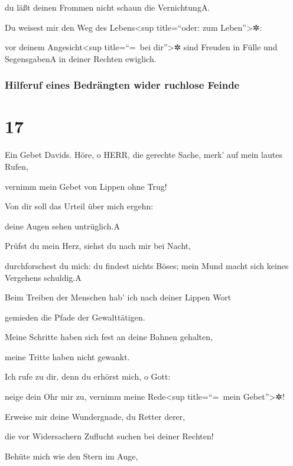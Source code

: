 du läßt deinen Frommen nicht schaun die Vernichtung{A}.

Du weisest mir den Weg des Lebens\textless sup
title=``oder: zum Leben''\textgreater✲:

vor deinem Angesicht\textless sup title=``=~bei dir''\textgreater✲ sind
Freuden in Fülle und Segensgaben{A} in deiner Rechten ewiglich.

\hypertarget{hilferuf-eines-bedruxe4ngten-wider-ruchlose-feinde}{%
\subsubsection{Hilferuf eines Bedrängten wider ruchlose
Feinde}\label{hilferuf-eines-bedruxe4ngten-wider-ruchlose-feinde}}

\hypertarget{section-16}{%
\section{17}\label{section-16}}

Ein Gebet Davids. Höre, o HERR, die gerechte Sache, merk'
auf mein lautes Rufen,

vernimm mein Gebet von Lippen ohne Trug!

Von dir soll das Urteil über mich ergehn:

deine Augen sehen untrüglich.{A}

Prüfst du mein Herz, siehst du nach mir bei Nacht,

durchforschest du mich: du findest nichts Böses; mein Mund macht sich
keines Vergehens schuldig.{A}

Beim Treiben der Menschen hab' ich nach deiner Lippen Wort

gemieden die Pfade der Gewalttätigen.

Meine Schritte haben sich fest an deine Bahnen gehalten,

meine Tritte haben nicht gewankt.

Ich rufe zu dir, denn du erhörst mich, o Gott:

neige dein Ohr mir zu, vernimm meine Rede\textless sup title=``=~mein
Gebet''\textgreater✲!

Erweise mir deine Wundergnade, du Retter derer,

die vor Widersachern Zuflucht suchen bei deiner Rechten!

Behüte mich wie den Stern im Auge,

